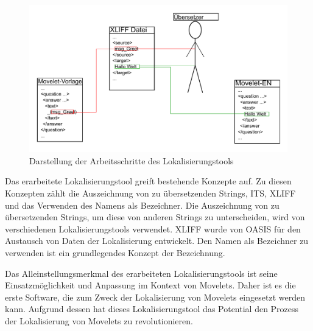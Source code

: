 \begin{figure}
	\centering
	\includegraphics[width=1\textwidth]{img/zusammenfassung.pdf}
	\caption{Darstellung der Arbeitsschritte des Lokalisierungstools}
	\label{fig:zsm}
\end{figure}
\par
Das erarbeitete Lokalisierungstool greift bestehende Konzepte auf. Zu diesen Konzepten zählt die Auszeichnung von zu übersetzenden Strings, \ac{ITS}, \ac{XLIFF} und das Verwenden des Namens als Bezeichner. Die Auszeichnung von zu übersetzenden Strings, um diese von anderen Strings zu unterscheiden, wird von verschiedenen Lokalisierungstools verwendet. \ac{XLIFF} wurde von \ac{OASIS} für den Austausch von Daten der Lokalisierung entwickelt. Den Namen als Bezeichner zu verwenden ist ein grundlegendes Konzept der Bezeichnung.
\par
Das Alleinstellungsmerkmal des erarbeiteten Lokalisierungstools ist seine Einsatzmöglichkeit und Anpassung im Kontext von Movelets. Daher ist es die erste Software, die zum Zweck der Lokalisierung von Movelets eingesetzt werden kann. Aufgrund dessen hat dieses Lokalisierungstool das Potential den Prozess der Lokalisierung von Movelets zu revolutionieren.